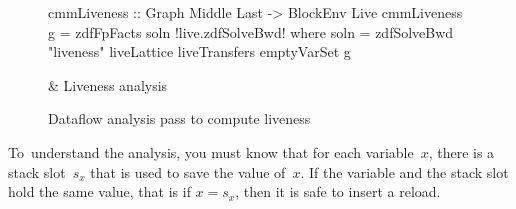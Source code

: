 \documentclass[blockstyle,preprint,natbib,nocopyrightspace]{sigplanconf}
\newcommand\slotof[1]{\ensuremath{s_{#1}}}
\newcommand{\authornote}[1]{{\em #1}}
\def\authornote#1{\unskip\relax}
\newcommand{\simon}[1]{\authornote{SLPJ: #1}}
\newcommand\figlabel[1]{\label{fig:#1}}
\begin{document}
\begin{figure*}
\begin{codetable}
\T\begin{code}
cmmLiveness :: Graph Middle Last -> BlockEnv Live
cmmLiveness g = zdfFpFacts soln
!live.zdfSolveBwd!   where soln = zdfSolveBwd "liveness" liveLattice liveTransfers emptyVarSet g
\end{code}%
\B
& Liveness \mbox{analysis}\\
\end{codetable}
\caption{Dataflow analysis pass to compute liveness}
\figlabel{liveness-all}
\figlabel{liveness}
\figlabel{live-lattice}
\figlabel{live-transfers}
\figlabel{live-running}
\end{figure*}
%
%



\simon{I'd like to see the term ``available variables analysis'' 
mentioned in the Pass 2 item above.}
To~understand the \simon{available-variables} analysis, you must know that for each variable~$x$,
there is a stack slot~\slotof x that is used to save the value of~$x$.
%
If the variable and the stack slot hold the same value,
that is if $x = \slotof x$,
then it is safe to insert a reload.


\ifpagetuning\enlargethispage{0.5\baselineskip}\fi
\end{document}
